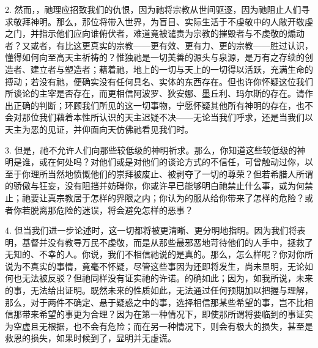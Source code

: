 2. 然而，，祂理应招致我们的仇恨，因为祂将宗教从世间驱逐，因为祂阻止人们寻求敬拜神明。那么，那位将带入世界，为盲目、实际生活于不虔敬中的人敞开敬虔之门，并指示他们应向谁俯伏者，难道竟被谴责为宗教的摧毁者与不虔敬的煽动者？又或者，有比这更真实的宗教——更有效、更有力、更的宗教——胜过认识，懂得如何向至高天主祈祷的？惟独祂是一切美善的源头与泉源，是万有之存续的创造者、建立者与塑造者；藉着祂，地上的一切与天上的一切得以活跃，充满生命的搏动；若没有祂，便确实没有任何具名、实体的东西存在。但也许你怀疑这位我们所谈论的主宰是否存在，而更相信阿波罗、狄安娜、墨丘利、玛尔斯的存在。请作出正确的判断；环顾我们所见的这一切事物，宁愿怀疑其他所有神明的存在，也不会对那位我们藉着本性所认识的天主迟疑不决——无论当我们呼求，还是当我们以天主为恶的见证，并仰面向天仿佛祂看见我们时。\par

3. 但是，祂不允许人们向那些较低级的神明祈求。那么，你知道这些较低级的神明是谁，或在何处吗？对他们或是对他们的谈论方式的不信任，可曾触动过你，以至于你理所当然地愤慨他们的崇拜被废止、被剥夺了一切的尊荣？但若希腊人所谓的骄傲与狂妄，没有阻挡并妨碍你，你或许早已能够明白祂禁止什么事，或为何禁止；祂要让真宗教居于怎样的界限之内；你认为的服从给你带来了怎样的危险？或者你若脱离那危险的迷误，将会避免怎样的恶事？\par

4. 但当我们进一步论述时，这一切都将被更清晰、更分明地指明。因为我们将表明，基督并没有教导万民不虔敬，而是从那些最邪恶地苛待他们的人手中，拯救了无知的、不幸的人。你说，我们不相信祂说的是真的。那么，怎么样呢？你对你所说为不真实的事情，竟毫不怀疑，尽管这些事因为还即将发生，尚未显明，无论如何也无法被反驳？但祂同样没有证实祂的许诺。的确如此；因为，如我所说，未来的事，无法给出证明。既然未来的性质如此，无法通过任何预期加以把握与理解，那么，对于两件不确定、悬于疑惑之中的事，选择相信那某些希望的事，岂不比相信那带来希望的事更为合理？因为在第一种情况下，即使那所谓将要临到的事证实为空虚且无根据，也不会有危险；而在另一种情况下，则会有极大的损失，甚至是救恩的损失，如果时候到了，显明并无虚谎。\par


